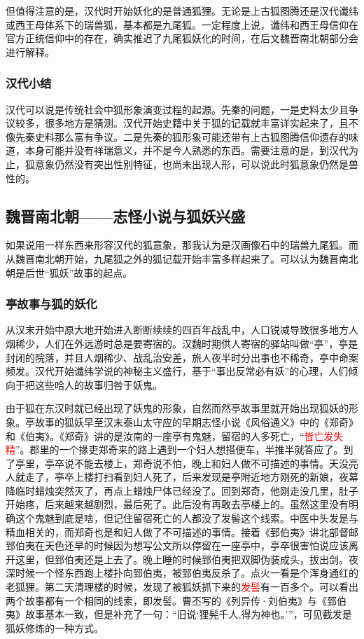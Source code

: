 \documentclass[UTF8, 12pt, A4paper]{article}
\begin{document}
但值得注意的是，汉代时开始妖化的是普通狐狸。无论是上古狐图腾还是汉代谶纬或西王母体系下的瑞兽狐，基本都是九尾狐。一定程度上说，谶纬和西王母信仰在官方正统信仰中的存在，确实推迟了九尾狐妖化的时间，在后文魏晋南北朝部分会进行解释。

\subsubsection{汉代小结}

汉代可以说是传统社会中狐形象演变过程的起源。先秦的问题，一是史料太少且争议较多，很多地方是猜测。汉代开始史籍中关于狐的记载就丰富详实起来了，且不像先秦史料那么富有争议。二是先秦的狐形象可能还带有上古狐图腾信仰遗存的味道，本身可能并没有祥瑞意义，并不是今人熟悉的东西。需要注意的是，到汉代为止，狐意象仍然没有突出性别特征，也尚未出现人形，可以说此时狐意象仍然是兽性的。

\subsection{魏晋南北朝——志怪小说与狐妖兴盛}

如果说用一样东西来形容汉代的狐意象，那我认为是汉画像石中的瑞兽九尾狐。而从魏晋南北朝开始，九尾狐之外的狐记载开始丰富多样起来了。可以认为魏晋南北朝是后世“狐妖”故事的起点。

\subsubsection{亭故事与狐的妖化}

从汉末开始中原大地开始进入断断续续的四百年战乱中，人口锐减导致很多地方人烟稀少，人们在外远游时总是要寄宿的。汉魏时期供人寄宿的驿站叫做“亭”，亭是封闭的院落，并且人烟稀少、战乱治安差，旅人夜半时分出事也不稀奇，亭中命案频发。汉代开始谶纬学说的神秘主义盛行，基于“事出反常必有妖”的心理，人们倾向于把这些哈人的故事归咎于妖鬼。

由于狐在东汉时就已经出现了妖鬼的形象，自然而然亭故事里就开始出现狐妖的形象。亭故事的狐妖早至汉末泰山太守应的早期志怪小说《风俗通义》中的《郑奇》和《伯夷》。《郑奇》讲的是汝南的一座亭有鬼魅，留宿的人多死亡，“\textcolor{red}{皆亡发失精}”。郡里的一个掾吏郑奇来的路上遇到一个妇人想搭便车，半推半就答应了。到了亭里，亭卒说不能去楼上，郑奇说不怕，晚上和妇人做不可描述的事情。天没亮人就走了，亭卒上楼打扫看到妇人死了，后来发现是亭附近地方刚死的新娘，夜幕降临时蜡烛突然灭了，再点上蜡烛尸体已经没了。回到郑奇，他刚走没几里，肚子开始疼，后来越来越剧烈，最后死了。此后没有再敢去亭楼上的。虽然这里没有明确这个鬼魅到底是啥，但记住留宿死亡的人都没了发髻这个线索。中医中头发是与精血相关的，而郑奇也是和妇人做了不可描述的事情。接着《郅伯夷》讲北部督邮郅伯夷在天色还早的时候因为想写公文所以停留在一座亭中，亭卒很害怕说应该离开这里，但郅伯夷还是上去了。晚上睡的时候郅伯夷把双脚伪装成头，拔出剑。夜深时候一个怪东西跑上楼扑向郅伯夷，被郅伯夷反杀了。点火一看是个浑身通红的老狐狸。第二天清理楼的时候，发现了被狐妖抓下来的\textcolor{red}{发髻}有一百多个。可以看出两个故事都有一个相同的线索，即发髻。曹丕写的《列异传·刘伯夷》与《郅伯夷》故事基本一致，但是补充了一句：“旧说‘狸髡千人,得为神也。’”，可见截发是狐妖修炼的一种方式。
\end{document}
